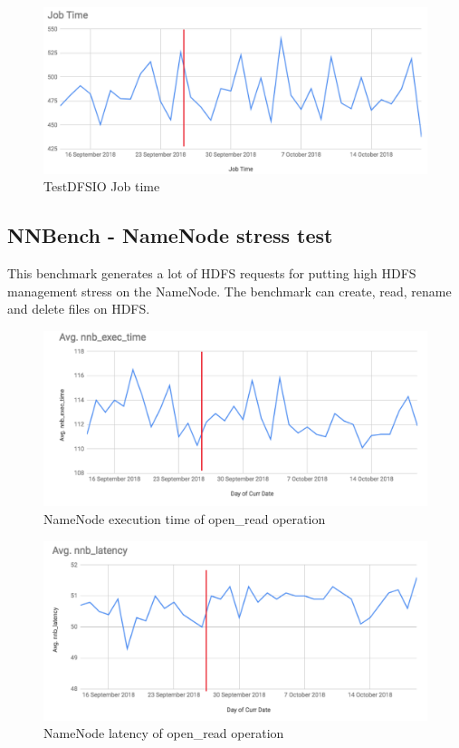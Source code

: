 \begin{figure}[H]
	\includegraphics[width=125mm, keepaspectratio]{figures/dfsio_job.png}
	\centering
	\caption{TestDFSIO Job time}
\end{figure}

\subsection{NNBench - NameNode stress test}
This benchmark generates a lot of HDFS requests for putting high HDFS management stress on the NameNode. The benchmark can create, read, rename and delete files on HDFS.

\begin{figure}[H]
	\includegraphics[width=125mm, keepaspectratio]{figures/nn_exec.png}
	\centering
	\caption{NameNode execution time of open\_read operation}
\end{figure}
\begin{figure}[H]
	\includegraphics[width=125mm, keepaspectratio]{figures/nn_latency.png}
	\centering
	\caption{NameNode latency of open\_read operation}
\end{figure}

